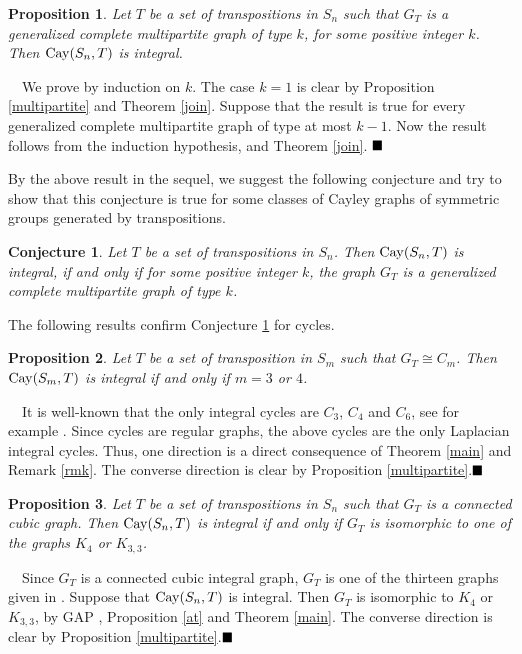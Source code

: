 \documentclass[12pt,a4paper]{article}
\newtheorem{proposition}{\bf Proposition}
\newtheorem{conj}{\bf Conjecture}
\renewcommand{\proof}{\noindent{\it\textbf{Proof.}}\ \ }
\newcommand{\Cay}{{\rm Cay}}
\newcommand{\eqd}{$\hfill \blacksquare$}
\begin{document}
\begin{proposition}\label{typek}
Let $T$ be a set of transpositions in $S_n$ such that $G_T$ is a generalized complete multipartite graph of type $k$, for some positive integer $k$. Then $\Cay(S_n,T)$ is integral.
\end{proposition}
\proof We prove by induction on $k$. The case $k=1$ is clear by Proposition \ref{multipartite} and Theorem \ref{join}. Suppose that the result is true for every generalized complete multipartite graph of type at most $k-1$. Now the result follows from the induction hypothesis, \cite[Proposition 5.2]{C} and Theorem \ref{join}.
\eqd

By the above result in the sequel, we suggest the following conjecture and try to show that this conjecture is true for some classes of Cayley graphs of symmetric groups generated by transpositions.

\begin{conj}\label{conj} Let $T$ be a set of transpositions in $S_n$. Then $\Cay(S_n, T)$ is integral, if and only if for some positive integer $k$,  the graph $G_T$ is a generalized complete multipartite graph of  type $k$.
\end{conj}

The following  results confirm Conjecture \ref{conj} for cycles.

\begin{proposition}\label{prop1}
Let $T$ be a set of transposition in $S_m$ such that $G_T\cong C_m$. Then $\Cay(S_m,T)$ is integral if and only if $m=3$ or $4$.
\end{proposition}
\proof It is well-known that the only integral cycles are $C_3$, $C_4$ and $C_6$, see for example \cite[p. 43]{BCRSS}. Since cycles are regular graphs, the above cycles are the only Laplacian integral cycles. Thus, one direction is a direct consequence of 
Theorem \ref{main} and Remark \ref{rmk}. The converse direction is clear by Proposition \ref{multipartite}.\eqd 

\begin{proposition} \label{prop2} Let $T$ be a set of transpositions in $S_n$ such that $G_T$ is a connected cubic graph. Then $\Cay(S_n,T)$ is integral if and only if $G_T$ is isomorphic to one of the graphs $K_4$ or $K_{3,3}$.
\end{proposition}
\proof Since $G_T$ is a connected cubic integral graph, $G_T$ is one of the thirteen graphs given in \cite{schwenk}.  Suppose that $\Cay(S_n,T)$ is integral.  Then $G_T$ is isomorphic to $K_4$ or $K_{3,3}$, by GAP \cite{GAP2022}, Proposition \ref{at} and Theorem \ref{main}. The converse direction is clear by Proposition \ref{multipartite}.\eqd
\end{document}
